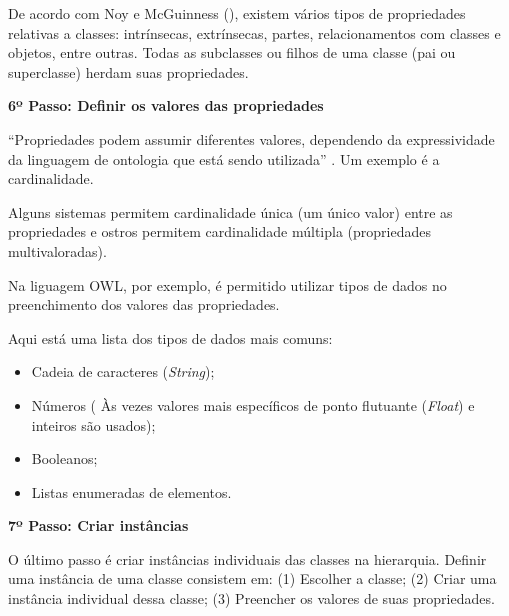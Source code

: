   De acordo com Noy e McGuinness (\citeyear{noy15}), existem vários tipos de propriedades relativas a classes: intrínsecas, 
  extrínsecas, partes, relacionamentos com classes e objetos, entre outras. Todas as subclasses ou filhos de uma classe 
  (pai ou superclasse) herdam suas propriedades.
  
\vspace{0.5cm}  
\pagebreak
  
{\raggedright
  \textbf{6º Passo: Definir os valores das propriedades}
}
  
  “Propriedades podem assumir diferentes valores, dependendo da expressividade da linguagem de ontologia que está sendo utilizada”
  \cite{breitman05}. Um exemplo é a cardinalidade.
  
  Alguns sistemas permitem cardinalidade única (um único valor) entre as propriedades e ostros permitem cardinalidade múltipla 
  (propriedades multivaloradas). \cite{noy15}
  
  Na liguagem OWL, por exemplo, é permitido utilizar tipos de dados no preenchimento dos valores das propriedades. \cite{breitman05}
  
{\raggedright  
  Aqui está uma lista dos tipos de dados mais comuns:
}
  
  \begin{itemize}
   \item Cadeia de caracteres (\textit{String});
   \item Números ( Às vezes valores mais específicos de ponto flutuante (\textit{Float}) e inteiros são usados);
   \item Booleanos;
   \item Listas enumeradas de elementos.
  \end{itemize}
  
\vspace{0.5cm}  

{\raggedright  
\textbf{7º Passo: Criar instâncias}
}

  O último passo é criar instâncias individuais das classes na hierarquia. Definir uma instância de uma classe consistem em:
  (1) Escolher a classe; 
  (2) Criar uma instância individual dessa classe; 
  (3) Preencher os valores de suas propriedades. \cite{noy15}
  